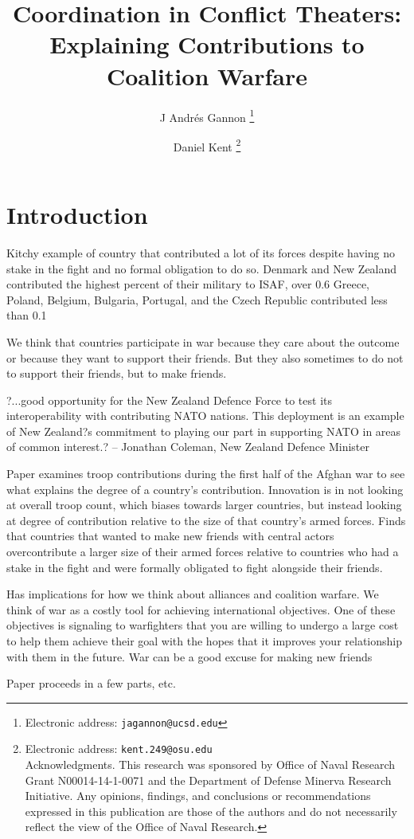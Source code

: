 \documentclass[12pt,letterpaper]{article}
\title{Coordination in Conflict Theaters: Explaining Contributions to Coalition Warfare}
\author{J Andr\'{e}s Gannon%
	\thanks{Electronic address: \texttt{jagannon@ucsd.edu}}}
\affil{Department of Political Science \\ University of California, San Diego}
\author{Daniel Kent%
	\thanks{Electronic address: \texttt{kent.249@osu.edu} \\ Acknowledgments. This research was sponsored by Office of Naval Research Grant N00014-14-1-0071 and the Department of Defense Minerva Research Initiative. Any opinions, findings, and conclusions or recommendations expressed in this publication are those of the authors and do not necessarily reflect the view of the Office of Naval Research.}}
\affil{Department of Political Science \\ Ohio State University}
\begin{document}
\maketitle

\begin{abstract}

\end{abstract}

\section{Introduction}
Kitchy example of country that contributed a lot of its forces despite having no stake in the fight and no formal obligation to do so. Denmark and New Zealand contributed the highest percent of their military to ISAF, over 0.6%
Greece, Poland, Belgium, Bulgaria, Portugal, and the Czech Republic contributed less than 0.1%

We think that countries participate in war because they care about the outcome or because they want to support their friends. But they also sometimes to do not to support their friends, but to make friends.

?...good opportunity for the New Zealand Defence Force to test its interoperability with contributing NATO nations. This deployment is an example of New Zealand?s commitment to playing our part in supporting NATO in areas of common interest.? -- Jonathan Coleman, New Zealand Defence Minister


Paper examines troop contributions during the first half of the Afghan war to see what explains the degree of a country's contribution. Innovation is in not looking at overall troop count, which biases towards larger countries, but instead looking at degree of contribution relative to the size of that country's armed forces. Finds that countries that wanted to make new friends with central actors overcontribute a larger size of their armed forces relative to countries who had a stake in the fight and were formally obligated to fight alongside their friends.

Has implications for how we think about alliances and coalition warfare. We think of war as a costly tool for achieving international objectives. One of these objectives is signaling to warfighters that you are willing to undergo a large cost to help them achieve their goal with the hopes that it improves your relationship with them in the future. War can be a good excuse for making new friends

Paper proceeds in a few parts, etc.
\end{document}
